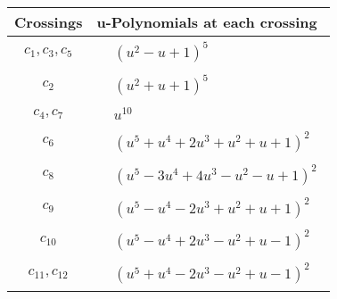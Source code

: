 \documentclass[1p]{elsarticle_modified}
\theoremstyle{definition}
\begin{document}
\begin{tabular}{m{50pt}|m{274pt}}
Crossings & \hspace{64pt}u-Polynomials at each crossing \\
\hline $$\begin{aligned}c_{1},c_{3},c_{5}\end{aligned}$$&$\begin{aligned}
&(u^2- u+1)^5
\end{aligned}$\\
\hline $$\begin{aligned}c_{2}\end{aligned}$$&$\begin{aligned}
&(u^2+u+1)^5
\end{aligned}$\\
\hline $$\begin{aligned}c_{4},c_{7}\end{aligned}$$&$\begin{aligned}
&u^{10}
\end{aligned}$\\
\hline $$\begin{aligned}c_{6}\end{aligned}$$&$\begin{aligned}
&(u^5+u^4+2 u^3+u^2+u+1)^2
\end{aligned}$\\
\hline $$\begin{aligned}c_{8}\end{aligned}$$&$\begin{aligned}
&(u^5-3 u^4+4 u^3- u^2- u+1)^2
\end{aligned}$\\
\hline $$\begin{aligned}c_{9}\end{aligned}$$&$\begin{aligned}
&(u^5- u^4-2 u^3+u^2+u+1)^2
\end{aligned}$\\
\hline $$\begin{aligned}c_{10}\end{aligned}$$&$\begin{aligned}
&(u^5- u^4+2 u^3- u^2+u-1)^2
\end{aligned}$\\
\hline $$\begin{aligned}c_{11},c_{12}\end{aligned}$$&$\begin{aligned}
&(u^5+u^4-2 u^3- u^2+u-1)^2
\end{aligned}$\\
\hline
\end{tabular}\\~\\
\end{document}
